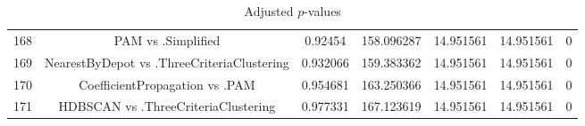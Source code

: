 \documentclass[a4paper,10pt]{article}
\begin{document}
\begin{landscape}
\begin{table}[!htp]
\begin{tabular}{ccccccc}
168&PAM vs .Simplified&0.92454&158.096287&14.951561&14.951561&0\\
169&NearestByDepot vs .ThreeCriteriaClustering&0.932066&159.383362&14.951561&14.951561&0\\
170&CoefficientPropagation vs .PAM&0.954681&163.250366&14.951561&14.951561&0\\
171&HDBSCAN vs .ThreeCriteriaClustering&0.977331&167.123619&14.951561&14.951561&0\\
\hline
\end{tabular}
\caption{Adjusted $p$-values}
\end{table}

\end{landscape}
\end{document}
